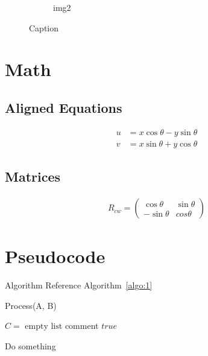 \documentclass[english]{article}
\begin{document}
\begin{figure}[!htb]
\begin{subfigure}{.45\textwidth}
    \centering
    \caption{img2}
    \label{fig:1.2}
  \end{subfigure}
  \centering
  \caption{Caption}
  \label{fig:1}
\end{figure}


\clearpage
\pagebreak
\section{Math}

\subsection{Aligned Equations}

\begin{align*}
  u & = x \cos\theta - y \sin\theta \\
  v & = x \sin\theta + y \cos\theta
\end{align*}

\subsection{Matrices}

\begin{align*}
  R_{cw} = \begin{pmatrix}
             \cos \theta  & \sin \theta \\
             -\sin \theta & cos \theta
           \end{pmatrix}
\end{align*}


\clearpage
\pagebreak
\section{Pseudocode}

\par Algorithm Reference Algorithm~\ref{algo:1}

\begin{algorithm}
  \caption{Process(A, B)}\label{algo:1}
  \begin{algorithmic}[1]

    \State $C = \text{ empty list}$ \Comment comment
    \State \Return $true$
    \Else

    \State Do something
    \EndWhile

    \EndIf

  \end{algorithmic}
\end{algorithm}
\end{document}
